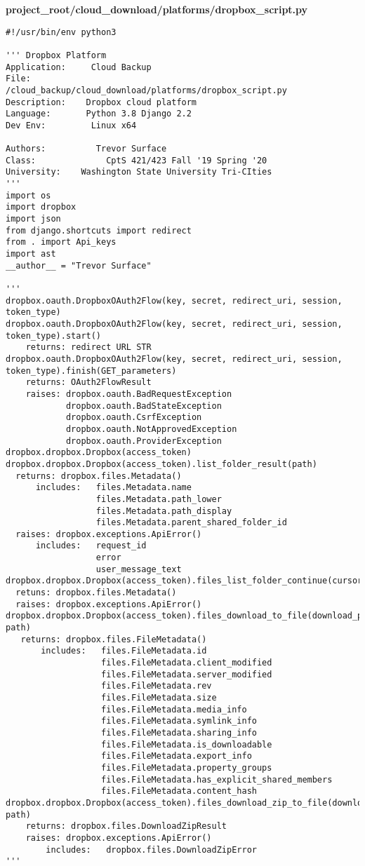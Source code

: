 \documentclass{article}
\begin{document}
\newpage
\textbf{project\_root/cloud\_download/platforms/dropbox\_script.py}
\begin{verbatim}
#!/usr/bin/env python3

''' Dropbox Platform
Application:     Cloud Backup
File:                 /cloud_backup/cloud_download/platforms/dropbox_script.py
Description:    Dropbox cloud platform
Language:       Python 3.8 Django 2.2
Dev Env:         Linux x64

Authors:          Trevor Surface
Class:              CptS 421/423 Fall '19 Spring '20
University:    Washington State University Tri-CIties
'''
import os
import dropbox
import json
from django.shortcuts import redirect
from . import Api_keys
import ast 
__author__ = "Trevor Surface"

'''
dropbox.oauth.DropboxOAuth2Flow(key, secret, redirect_uri, session, token_type)
dropbox.oauth.DropboxOAuth2Flow(key, secret, redirect_uri, session, token_type).start()
    returns: redirect URL STR
dropbox.oauth.DropboxOAuth2Flow(key, secret, redirect_uri, session, token_type).finish(GET_parameters)
    returns: OAuth2FlowResult
    raises: dropbox.oauth.BadRequestException
            dropbox.oauth.BadStateException
            dropbox.oauth.CsrfException
            dropbox.oauth.NotApprovedException
            dropbox.oauth.ProviderException
dropbox.dropbox.Dropbox(access_token)
dropbox.dropbox.Dropbox(access_token).list_folder_result(path)
  returns: dropbox.files.Metadata()
      includes:   files.Metadata.name
                  files.Metadata.path_lower 
                  files.Metadata.path_display 
                  files.Metadata.parent_shared_folder_id
  raises: dropbox.exceptions.ApiError()
      includes:   request_id
                  error 
                  user_message_text
dropbox.dropbox.Dropbox(access_token).files_list_folder_continue(cursor)
  retuns: dropbox.files.Metadata()
  raises: dropbox.exceptions.ApiError()
dropbox.dropbox.Dropbox(access_token).files_download_to_file(download_path, path)
   returns: dropbox.files.FileMetadata()
       includes:   files.FileMetadata.id
                   files.FileMetadata.client_modified
                   files.FileMetadata.server_modified 
                   files.FileMetadata.rev 
                   files.FileMetadata.size 
                   files.FileMetadata.media_info 
                   files.FileMetadata.symlink_info 
                   files.FileMetadata.sharing_info 
                   files.FileMetadata.is_downloadable 
                   files.FileMetadata.export_info 
                   files.FileMetadata.property_groups
                   files.FileMetadata.has_explicit_shared_members  
                   files.FileMetadata.content_hash
dropbox.dropbox.Dropbox(access_token).files_download_zip_to_file(download_path, path)
    returns: dropbox.files.DownloadZipResult
    raises: dropbox.exceptions.ApiError()
        includes:   dropbox.files.DownloadZipError
'''


\end{verbatim}
\end{document}
